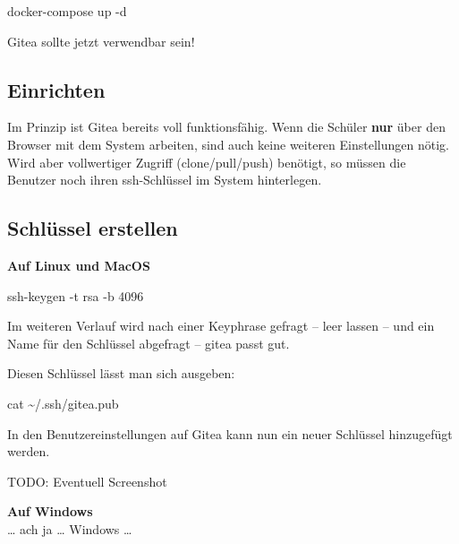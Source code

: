 \documentclass[
  letterpaper,
  DIV=11]{scrreprt}
\newenvironment{Shaded}{\begin{snugshade}}{\end{snugshade}}
\newcommand{\AttributeTok}[1]{\textcolor[rgb]{0.40,0.45,0.13}{#1}}
\newcommand{\ExtensionTok}[1]{\textcolor[rgb]{0.00,0.23,0.31}{#1}}
\newcommand{\FunctionTok}[1]{\textcolor[rgb]{0.28,0.35,0.67}{#1}}
\newcommand{\NormalTok}[1]{\textcolor[rgb]{0.00,0.23,0.31}{#1}}
\begin{document}
\begin{Shaded}
\begin{Highlighting}[]
\ExtensionTok{docker{-}compose}\NormalTok{ up }\AttributeTok{{-}d}
\end{Highlighting}
\end{Shaded}

Gitea sollte jetzt verwendbar sein!

\subsection{Einrichten}\label{einrichten}

Im Prinzip ist Gitea bereits voll funktionsfähig. Wenn die Schüler
\textbf{nur} über den Browser mit dem System arbeiten, sind auch keine
weiteren Einstellungen nötig. Wird aber vollwertiger Zugriff
(clone/pull/push) benötigt, so müssen die Benutzer noch ihren
ssh-Schlüssel im System hinterlegen.

\subsection{Schlüssel erstellen}\label{schluxfcssel-erstellen}

\textbf{Auf Linux und MacOS}

\begin{Shaded}
\begin{Highlighting}[]
\FunctionTok{ssh{-}keygen} \AttributeTok{{-}t}\NormalTok{ rsa }\AttributeTok{{-}b}\NormalTok{ 4096 }
\end{Highlighting}
\end{Shaded}

Im weiteren Verlauf wird nach einer Keyphrase gefragt -- leer lassen --
und ein Name für den Schlüssel abgefragt -- gitea passt gut.

Diesen Schlüssel lässt man sich ausgeben:

\begin{Shaded}
\begin{Highlighting}[]
\FunctionTok{cat}\NormalTok{ \textasciitilde{}/.ssh/gitea.pub}
\end{Highlighting}
\end{Shaded}

In den Benutzereinstellungen auf Gitea kann nun ein neuer Schlüssel
hinzugefügt werden.

TODO: Eventuell Screenshot

\textbf{Auf Windows}\\
\ldots{} ach ja \ldots{} Windows \ldots{}
\end{document}
